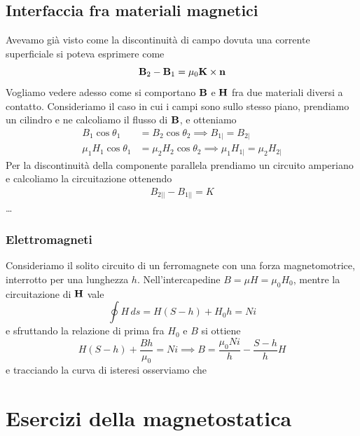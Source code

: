 \section{Interfaccia fra materiali magnetici}
Avevamo già visto come la discontinuità di campo dovuta una corrente superficiale si poteva esprimere come
\begin{equation}
  \mathbf{ B }_2 - \mathbf{ B }_1 = \mu_0 \mathbf{ K } \times \mathbf{ n }
\end{equation}
Vogliamo vedere adesso come si comportano $ \mathbf{ B } $ e $ \mathbf{ H } $ fra due materiali diversi a contatto. Consideriamo il caso in cui i 
campi sono sullo stesso piano, prendiamo un cilindro e ne calcoliamo il flusso di $ \mathbf{ B } $, e otteniamo
\begin{align}
  B_1 \cos \theta_1 &= B_2 \cos \theta_2 \implies B_{1|} = B_{2|}
  \\
  \mu_1 H_1 \cos \theta_1 &= \mu_2 H_2 \cos \theta_2 \implies \mu_1 H_{1|} = \mu_2 H_{2|}
\end{align}
Per la discontinuità della componente parallela prendiamo un circuito amperiano e calcoliamo la circuitazione ottenendo
\begin{align}
  B_{2||} - B_{1||} = K
\end{align}
\dots

\subsection{Elettromagneti}
Consideriamo il solito circuito di un ferromagnete con una forza magnetomotrice, interrotto per una lunghezza $ h $. Nell'intercapedine 
$ B = \mu H = \mu_0 H_0$, mentre la circuitazione di $ \mathbf{ H } $ vale 
\begin{equation}
  \oint H \,ds = H (S-h) + H_0 h = Ni
\end{equation}
e sfruttando la relazione di prima fra $ H_0 $ e $ B $ si ottiene 
\begin{equation}
  H (S-h) + \frac{B h }{\mu_0} = Ni \implies B = \frac{\mu_0 N i }{h} - \frac{S-h}{h} H
\end{equation}
e tracciando la curva di isteresi osserviamo che

\chapter{Esercizi della magnetostatica}
